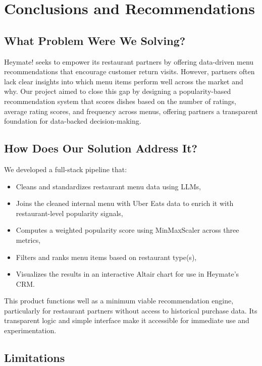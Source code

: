 \documentclass[
  11pt,
  a4paper,
  DIV=11,
  numbers=noendperiod]{scrartcl}
\providecommand{\tightlist}{%
  \setlength{\itemsep}{0pt}\setlength{\parskip}{0pt}}\usepackage{longtable,booktabs,array}
\begin{document}
\section{Conclusions and
Recommendations}\label{conclusions-and-recommendations}

\subsection{What Problem Were We
Solving?}\label{what-problem-were-we-solving}

Heymate! seeks to empower its restaurant partners by offering
data-driven menu recommendations that encourage customer return visits.
However, partners often lack clear insights into which menu items
perform well across the market and why. Our project aimed to close this
gap by designing a popularity-based recommendation system that scores
dishes based on the number of ratings, average rating scores, and
frequency across menus, offering partners a transparent foundation for
data-backed decision-making.

\subsection{How Does Our Solution Address
It?}\label{how-does-our-solution-address-it}

We developed a full-stack pipeline that:

\begin{itemize}
\tightlist
\item
  Cleans and standardizes restaurant menu data using LLMs,
\item
  Joins the cleaned internal menu with Uber Eats data to enrich it with
  restaurant-level popularity signals,
\item
  Computes a weighted popularity score using MinMaxScaler across three
  metrics,
\item
  Filters and ranks menu items based on restaurant type(s),
\item
  Visualizes the results in an interactive Altair chart for use in
  Heymate's CRM.
\end{itemize}

This product functions well as a minimum viable recommendation engine,
particularly for restaurant partners without access to historical
purchase data. Its transparent logic and simple interface make it
accessible for immediate use and experimentation.

\subsection{Limitations}\label{limitations-1}
\end{document}
